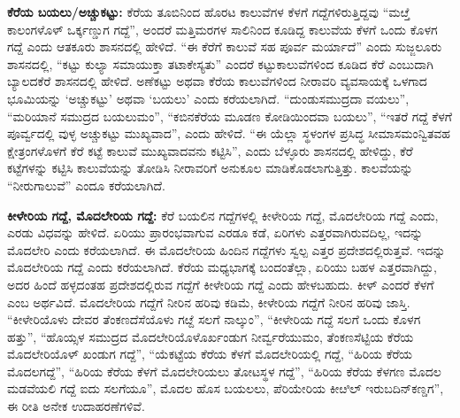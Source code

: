 \textbf{ಕೆರೆಯ ಬಯಲು/ಅಚ್ಚುಕಟ್ಟು:} ಕೆರೆಯ ತೂಬಿನಿಂದ ಹೊರಟ ಕಾಲುವೆಗಳ ಕೆಳಗೆ ಗದ್ದೆಗಳಿರುತ್ತಿದ್ದವು “ಮೞ್ತೆ ಕಾಲಂಗಳೊಳ್​ ಒರ್ಕ್ಕಣ್ಡುಗ ಗದ್ದೆ”, ಅಂದರೆ ಮತ್ತಿಮರಗಳ ಸಾಲಿನಿಂದ ಕೂಡಿದ್ದ ಕಾಲುವೆಯ ಕೆಳಗೆ ಒಂದು ಕೊಳಗ ಗದ್ದೆ ಎಂದು ಆತಕೂರು ಶಾಸನದಲ್ಲಿ ಹೇಳಿದೆ. “ಈ ಕೆರೆಗೆ ಕಾಲುವೆ ಸಹ ಪೂರ್ವ ಮರ್ಯಾದೆ” ಎಂದು ಸುಜ್ಜಲೂರು ಶಾಸನದಲ್ಲಿ, “ಕಟ್ಟು ಕುಲ್ಯಾ ಸಮಾಯುಕ್ತಾ ತಟಾಕೇಸ್ಯತು” ಎಂದರೆ ಕಟ್ಟುಕಾಲುವೆಗಳಿಂದ ಕೂಡಿದ ಕೆರೆ ಎಂಬುದಾಗಿ ಬ್ಯಾಲದಕೆರೆ ಶಾಸನದಲ್ಲಿ ಹೇಳಿದೆ. ಅಣೆಕಟ್ಟು ಅಥವಾ ಕೆರೆಯ ಕಾಲುವೆಗಳಿಂದ ನೀರಾವರಿ ವ್ಯವಸಾಯಕ್ಕೆ ಒಳಗಾದ ಭೂಮಿಯನ್ನು ‘ಅಚ್ಚುಕಟ್ಟು’ ಅಥವಾ ‘ಬಯಲು’ ಎಂದು ಕರೆಯಲಾಗಿದೆ. “ದುಂಡುಸಮುದ್ರದಾ ವಯಲು”, “ಮರಿಯಾನೆ ಸಮುದ್ರದ ಬಯಲುಮಂ”, “ಕಬಿನಕೆರೆಯ ಮೂಡಣ ಕೋಡಿಯಿಂದವಾ ಬಯಲು”, “ಇತರೆ ಗದ್ದೆ ಕೆಳಗೆ ಪೂರ್ವ್ವದಲ್ಲಿ ವುಳ್ಳ ಅಚ್ಚುಕಟ್ಟು ಮುಖ್ಯವಾದ”, ಎಂದು ಹೇಳಿದೆ. “ಈ ಯೆಲ್ಲಾ ಸ್ಥಳಂಗಳ ಪ್ರಸಿದ್ಧ ಸೀಮಾಸಮಂನ್ವಿತವಹ ಕ್ಷೇತ್ರಂಗಳೊಳಗೆ ಕೆರೆ ಕಟ್ಟೆ ಕಾಲುವೆ ಮುಖ್ಯವಾದವನು ಕಟ್ಟಿಸಿ”, ಎಂದು ಬೆಳ್ಳೂರು ಶಾಸನದಲ್ಲಿ ಹೇಳಿದ್ದು, ಕೆರೆ ಕಟ್ಟೆಗಳನ್ನು ಕಟ್ಟಿಸಿ ಕಾಲುವೆಯನ್ನು ತೋಡಿಸಿ ನೀರಾವರಿಗೆ ಅನುಕೂಲ ಮಾಡಿಕೊಡಲಾಗುತ್ತಿತ್ತು. ಕಾಲವೆಯನ್ನು “ನೀರುಗಾಲುವೆ” ಎಂದೂ ಕರೆಯಲಾಗಿದೆ.

\vskip 2pt

\textbf{ಕೀಳೇರಿಯ ಗದ್ದೆ, ಮೊದಲೇರಿಯ ಗದ್ದೆ:} ಕೆರೆ ಬಯಲಿನ ಗದ್ದೆಗಳಲ್ಲಿ ಕೀಳೇರಿಯ ಗದ್ದೆ, ಮೊದಲೇರಿಯ ಗದ್ದೆ ಎಂದು, ಎರಡು ವಿಧವನ್ನು ಹೇಳಿದೆ. ಏರಿಯು ಪ್ರಾರಂಭವಾಗುವ ಎರಡೂ ಕಡೆ, ಏರಿಗಳು ಎತ್ತರವಾಗಿರುವದಿಲ್ಲ, ಇದನ್ನು ಮೊದಲೇರಿ ಎಂದು ಕರೆಯಲಾಗಿದೆ. ಈ ಮೊದಲೇರಿಯ ಹಿಂದಿನ ಗದ್ದೆಗಳು ಸ್ವಲ್ಪ ಎತ್ತರ ಪ್ರದೇಶದಲ್ಲಿರುತ್ತವೆ. ಇದನ್ನು ಮೊದಲೇರಿಯ ಗದ್ದೆ ಎಂದು ಕರೆಯಲಾಗಿದೆ. ಕೆರೆಯ ಮಧ್ಯಭಾಗಕ್ಕೆ ಬಂದಂತೆಲ್ಲಾ, ಏರಿಯು ಬಹಳ ಎತ್ತರವಾಗಿದ್ದು, ಅದರ ಹಿಂದೆ ಹಳ್ಳದಂತಹ ಪ್ರದೇಶದಲ್ಲಿರುವ ಗದ್ದೆಗೆ ಕೀಳೇರಿಯ ಗದ್ದೆ ಎಂದು ಹೇಳಬಹುದು. ಕೀಳ್​ ಎಂದರೆ ಕೆಳಗೆ ಎಂಬ ಅರ್ಥವಿದೆ. ಮೊದಲೇರಿಯ ಗದ್ದೆಗೆ ನೀರಿನ ಹರಿವು ಕಡಿಮೆ, ಕೀಳೇರಿಯ ಗದ್ದೆಗೆ ನೀರಿನ ಹರಿವು ಜಾಸ್ತಿ. “ಕೀಳೇರಿಯೊಳು ದೇವರ ತೆಂಕಣದೆಸೆಯೊಳು ಗೞ್ದೆ ಸಲಗೆ ನಾಲ್ಕುಂ”, “ಕೀಳೇರಿಯ ಗದ್ದೆ ಸಲಗೆ ಒಂದು ಕೊಳಗ ಹತ್ತು”, “ಹೊಯ್ಸಳ ಸಮುದ್ರದ ಮೊದಲೇರಿಯೊಳೊರ್ಖಂಡುಗ ನೀರ್ವ್ವರೆಯುಮಂ, ತೆಂಕಣಸೆಟ್ಟಿಯ ಕೆರೆಯ ಮೊದಲೇರಿಯೊಳ್​ ಖಂಡುಗ ಗದ್ದೆ”, “ಯೆಕಟ್ಟೆಯ ಕೆರೆಯ ಕೆಳಗೆ ಮೊದಲೇರಿಯಲ್ಲಿ ಗದ್ದೆ, “ಹಿರಿಯ ಕೆರೆಯ ಮೊದಲಗದ್ದೆ”, “ಹಿರಿಯ ಕೆರೆಯ ಕೆಳಗೆ ಮೊದಲೇರಿಯಲು ತೋಟಸ್ಥಳ ಗದ್ದೆ”, “ಹಿರಿಯ ಕೆರೆಯ ಕೆಳಗಣ ಮೊದಲ ಮಡವೆಯಲಿ ಗದ್ದೆ ಐದು ಸಲಗೆಯೂ”, ಮೊದಲ ಹೊಸ ಬಯಲಲು, ಪೆರಿಯೇರಿಯ ಕೀೞಿಲ್​ ಇರುಬದಿನ್​ ಕಣ್ಡಗ”, ಈ ರೀತಿ ಅನೇಕ ಉದಾಹರಣೆಗಳಿವೆ.

